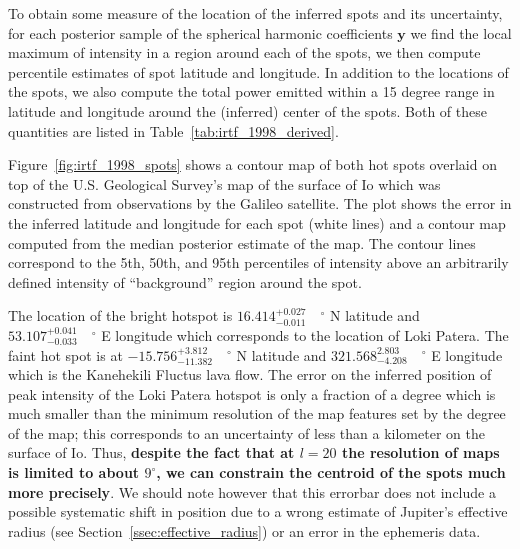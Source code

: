 \documentclass[linenumbers,modern]{aastex62}
\begin{document}
To obtain some measure of the location of the inferred spots and its uncertainty, for each posterior sample of the spherical harmonic coefficients $\mathbf{y}$ we find the local maximum of intensity in a region around each of the spots, we then compute percentile estimates of spot latitude and longitude.
In addition to the locations of the spots, we also compute the total power emitted within a 15 degree range in latitude and longitude around the (inferred) center of the spots.
Both of these quantities are listed in Table~\ref{tab:irtf_1998_derived}. 

Figure~\ref{fig:irtf_1998_spots} shows  a contour map of both hot spots overlaid on top of the U.S. Geological Survey's map of the surface of Io \citep{williams2011} which was constructed from observations by the Galileo satellite.
The plot shows the error in the inferred latitude and longitude for each spot (white lines) and a contour map computed from the median posterior estimate of the map.
The contour lines correspond to the 5th, 50th, and 95th percentiles of intensity above an arbitrarily defined intensity of ``background'' region around the spot.

The location of the bright hotspot is $16.414_{-0.011}^{+0.027}\quad^\circ$ N latitude and $53.107_{-0.033}^{+0.041}\quad^\circ$ E longitude which corresponds to the location of Loki Patera.
The faint hot spot is at $-15.756_{-11.382}^{+3.812}\quad ^\circ$ N latitude and $321.568_{-4.208}^{2.803}\quad^\circ$ E longitude which is the Kanehekili Fluctus lava flow.
The error on the inferred position of peak intensity of the Loki Patera hotspot is only a fraction of a degree which is much smaller than the minimum resolution of the map features set by the degree of the map; this corresponds to an uncertainty of less than a kilometer on the surface of Io.
Thus, \textbf{despite the fact that at $l=20$ the resolution of maps is limited to about $9^\circ$, we can constrain the centroid of the spots much more precisely}.
We should note however that this errorbar does not include a possible systematic shift in position due to a wrong estimate of Jupiter's effective radius (see Section~\ref{ssec:effective_radius}) or an error in the ephemeris data.
\end{document}
